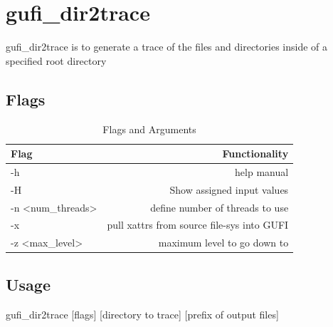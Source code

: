 \documentclass{article}
\begin{document}
\section{gufi\_dir2trace}
gufi\_dir2trace is to generate a trace of the files and directories inside of a specified root directory
\subsection{Flags}

\begin{table} [h]
\centering
\begin{tabular}{l|r}
Flag & Functionality \\\hline
-h & help manual \\
-H & Show assigned input values \\
-n \textless num\_threads\textgreater  & define number of threads to use \\
-x & pull xattrs from source file-sys into GUFI \\
-z \textless max\_level\textgreater & maximum level to go down to
\end{tabular}
\caption{\label{tab:widgets}Flags and Arguments}
\end{table}

\subsection{Usage}
gufi\_dir2trace [flags] [directory to trace] [prefix of output files]
\end{document}

